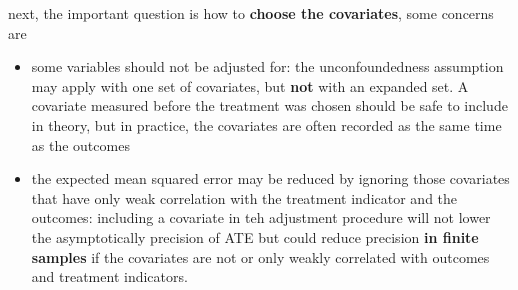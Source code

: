 \documentclass[twoside]{article}
\begin{document}
next, the important question is how to \textbf{choose the covariates}, some concerns are 
\begin{itemize}
    \item some variables should not be adjusted for: the unconfoundedness assumption may apply with one set of covariates, but \textbf{not} with an expanded set. A covariate measured before the treatment was chosen should be safe to include in theory, but in practice, the covariates are often recorded as the same time as the outcomes
    \item the expected mean squared error may be reduced by ignoring those covariates that have only weak correlation with the treatment indicator and the outcomes: including a covariate in teh adjustment procedure will not lower the asymptotically precision of ATE but could reduce precision \textbf{in finite samples} if the covariates are not or only weakly correlated with outcomes and treatment indicators.
\end{itemize}
\end{document}
